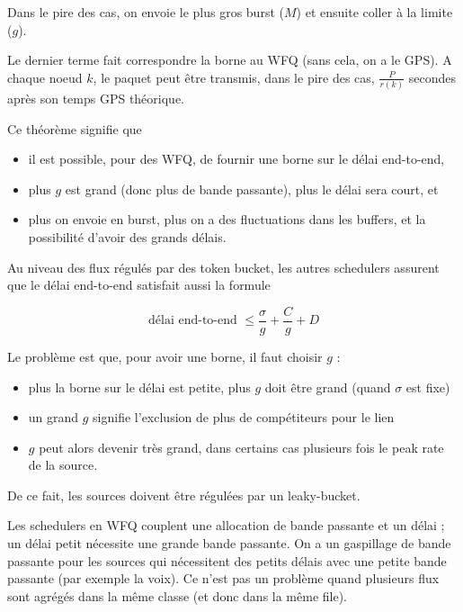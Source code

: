 			Dans le pire des cas, on envoie le plus gros burst ($M$) et ensuite coller à la limite ($g$).
			
			Le dernier terme fait correspondre la borne au WFQ (sans cela, on a le GPS). A chaque noeud $k$, le paquet peut être transmis, dans le pire des cas, $\frac{P}{r(k)}$ secondes après son temps GPS théorique.
		
		
			Ce théorème signifie que
			
			\begin{itemize}
				\item il est possible, pour des WFQ, de fournir une borne sur le délai end-to-end,
				\item plus $g$ est grand (donc plus de bande passante), plus le délai sera court, et
				\item plus on envoie en burst, plus on a des fluctuations dans les buffers, et la possibilité d'avoir des grands délais.
			\end{itemize}
			
			Au niveau des flux régulés par des token bucket, les autres schedulers assurent que le délai end-to-end satisfait aussi la formule
			
			$$\text{délai end-to-end } \leq \frac{\sigma}{g} + \frac{C}{g} + D$$
		
			Le problème est que, pour avoir une borne, il faut choisir $g$ :
			
			\begin{itemize}
				\item plus la borne sur le délai est petite, plus $g$ doit être grand (quand $\sigma$ est fixe)
				\item un grand $g$ signifie l'exclusion de plus de compétiteurs pour le lien
				\item $g$ peut alors devenir très grand, dans certains cas plusieurs fois le peak rate de la source.
			\end{itemize}
			
			De ce fait, les sources doivent être régulées par un leaky-bucket.
			
			Les schedulers en WFQ couplent une allocation de bande passante et un délai ; un délai petit nécessite une grande bande passante. On a un gaspillage de bande passante pour les sources qui nécessitent des petits délais avec une petite bande passante (par exemple la voix). Ce n'est pas un problème quand plusieurs flux sont agrégés dans la même classe (et donc dans la même file).
		
		
		
